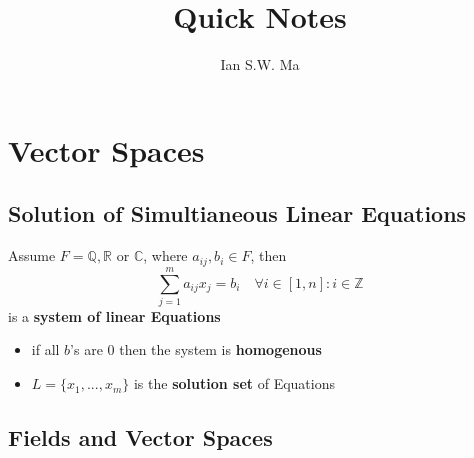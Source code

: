 \documentclass[12pt]{article}
\title{\coursename\\Quick Notes}
\author{Ian S.W. Ma}
\date{}
\theoremstyle{definition}
\begin{document}
\maketitle
\tableofcontents
\newpage

\setcounter{page}{1}
\section{Vector Spaces}

\subsection{Solution of Simultianeous Linear Equations}
Assume \(F = \mathbb{Q},\mathbb{R} \text{ or } \mathbb{C} \), where $a_{ij},b_i \in F$, then
\[
    \sum_{j=1}^m{a_{ij}x_j} = b_i \quad \forall i \in [1,n]:i \in \mathbb{Z}
\]
is a \textbf{system of linear Equations}

\begin{itemize}
    \item if all $b$'s are $0$ then the system is \textbf{homogenous}
    \item $L = \{x_1,...,x_m\}$ is the \textbf{solution set} of Equations
\end{itemize}

\subsection{Fields and Vector Spaces}
\end{document}
